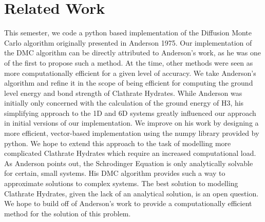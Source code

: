 \documentclass[journal=jacsat,manuscript=article]{achemso}
\begin{document}
\section{Related Work}

This semester, we code a python based implementation of the Diffusion Monte Carlo algorithm originally presented in Anderson 1975. Our implementation of the DMC algorithm can be directly attributed to Anderson's work, as he was one of the first to propose such a method. At the time, other methods were seen as more computationally efficient for a given level of accuracy. We take Anderson's algorithm and refine it in the scope of being efficient for computing the ground level energy and bond strength of Clathrate Hydrates. 
While Anderson was initially only concerned with the calculation of the ground energy of H3, his simplifying approach to the 1D and 6D systems greatly influenced our approach in initial versions of our implementation. We improve on his work by designing a more efficient, vector-based implementation using the numpy library provided by python. We hope to extend this approach to the task of modelling more complicated Clathrate Hydrates which require an increased computational load.
As Anderson points out, the Schrodinger Equation is only analytically solvable for certain, small systems. His DMC algorithm provides such a way to approximate solutions to complex systems. The best solution to modelling Clathrate Hydrates, given the lack of an analytical solution, is an open question. We hope to build off of Anderson's work to provide a computationally efficient method for the solution of this problem.
\end{document}
